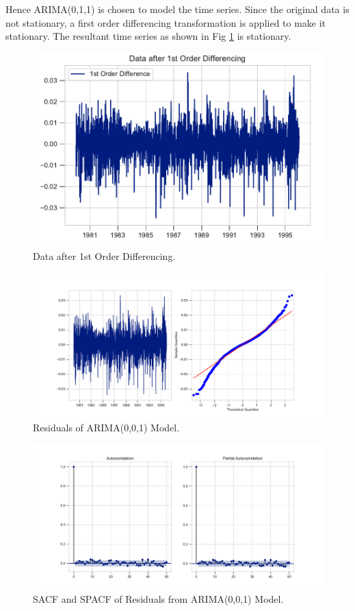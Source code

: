 \documentclass[]{article}
\begin{document}
Hence ARIMA(0,1,1) is chosen to model the time series. Since the original data is not stationary, a first order differencing transformation is applied to make it stationary. The resultant time series as shown in Fig \ref{fig:data_1_d} is stationary. 
%
\begin{figure}[hbtp]
	\centering
	\includegraphics[width=1\columnwidth]{../Figures/data_1_d.pdf}
	\caption{Data after 1st Order Differencing.}
	\label{fig:data_1_d}
\end{figure}
%


%
\begin{figure}[hbtp]
	\centering
	\includegraphics[width=1\columnwidth]{../Figures/res_after_arma.pdf}
	\caption{Residuals of ARIMA(0,0,1) Model.}
	\label{fig:res_after_arma}
\end{figure}
%
%
\begin{figure}[hbtp]
	\centering
	\includegraphics[width=1\columnwidth]{../Figures/sacf_n_spacf_after_arma.pdf}
	\caption{SACF and SPACF of Residuals from ARIMA(0,0,1) Model.}
	\label{fig:sacf_n_spacf_after_arma}
\end{figure}
%
\end{document}
